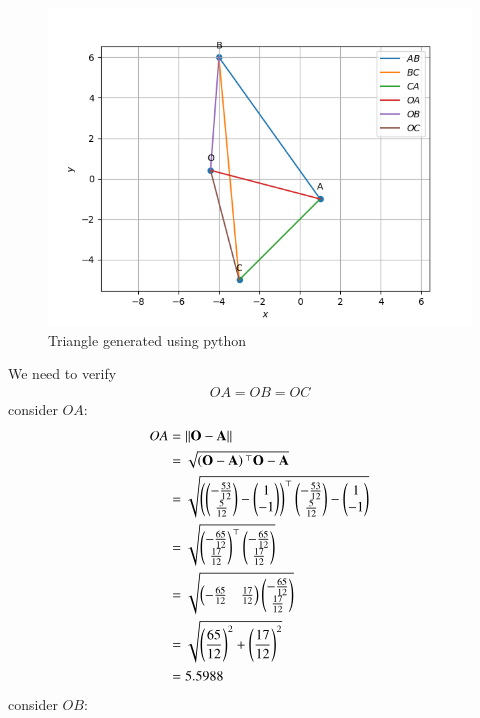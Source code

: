 \documentclass[journal,12pt,twocolumn]{IEEEtran}
\theoremstyle{remark}
\begin{document}
\begin{figure}
\centering
\includegraphics[width=\columnwidth]{./figs/main.png}
\caption{Triangle generated using python}
\label{fig:tri_sss_py}
\end{figure}
We need to verify \begin{align}OA = OB = OC\end{align}
consider $OA$:
\begin{align} 
OA &= \left\lVert\mathbf{O} - \mathbf{A}\right\rVert\\
&= \sqrt{\left(\mathbf{O}-\mathbf{A}\right){^\top}\mathbf{O}-\mathbf{A}}\\
&= \sqrt{\left(\begin{pmatrix}-\frac{53}{12} \\ \frac{5}{12}\end{pmatrix} - \begin{pmatrix}1\\-1\end{pmatrix}\right)^{\top}\begin{pmatrix}-\frac{53}{12}\\\frac{5}{12}\end{pmatrix} - \begin{pmatrix}1\\-1\end{pmatrix}}\\
&= \sqrt{\begin{pmatrix}-\frac{65}{12} \\ \frac{17}{12}\end{pmatrix}^{\top}\begin{pmatrix}-\frac{65}{12} \\ \frac{17}{12}\end{pmatrix}}\\
&= \sqrt{\begin{pmatrix}-\frac{65}{12} & \frac{17}{12}\end{pmatrix} \begin{pmatrix}-\frac{65}{12} \\ \frac{17}{12}\end{pmatrix}}\\
&= \sqrt{\left(\frac{65}{12}\right)^2 + \left(\frac{17}{12}\right)^2}\\
&= 5.5988 \label{eq:OA}
\end{align}
consider $OB$:
\end{document}

